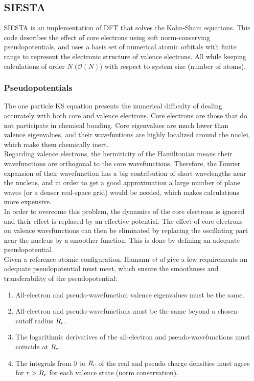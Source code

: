 
\subsection{SIESTA}
SIESTA\parencite{Soler2002} is an implementation of DFT that solves the Kohn-Sham equations. This code describes the effect of core electrons using soft norm-conserving pseudopotentials, and uses a basis set of numerical atomic orbitals with finite range to represent the electronic structure of valence electrons. All while keeping calculations of order \(N\) (\(\mathcal O(N)\)) with respect to system size (number of atoms).

\subsubsection*{Pseudopotentials}
The one particle KS equation presents the numerical difficulty of dealing accurately with both core and valence electrons. Core electrons are those that do not participate in chemical bonding. Core eigenvalues are much lower than valence eigenvalues, and their wavefuntions are highly localized around the nuclei, which make them chemically inert.\\

Regarding valence electrons, the hermiticity of the Hamiltonian means their wavefunctions are orthogonal to the core wavefunctions. Therefore, the Fourier expansion of their wavefunction has a big contribution of short wavelengths near the nucleus, and in order to get a good approximation a large number of plane waves (or a denser real-space grid) would be needed, which makes calculations more expensive.\\

In order to overcome this problem, the dynamics of the core electrons is ignored and their effect is replaced by an effective potential. The effect of core electrons on valence wavefunctions can then be eliminated by replacing the oscillating part near the nucleus by a smoother function. This is done by defining an adequate pseudopotential.\\

Given a reference atomic configuration, Hamann \textit{et al} give a few requirements an adequate pseudopotential must meet\parencite{Hamann1979}, which ensure the smoothness and transferability of the pseudopotential:
\begin{enumerate}
\item All-electron and pseudo-wavefunction valence eigenvalues must be the same.
\item All-electron and pseudo-wavefunctions must be the same beyond a chosen cutoff radius \(R_{\mathrm{c}}\).
\item The logarithmic derivatives of the all-electron and pseudo-wavefunctions must coincide at \(R_{\mathrm{c}}\).
\item The integrals from \(0\) to \(R_{\mathrm{c}}\) of the real and pseudo charge densities must agree for \(r > R_{\mathrm{c}}\) for each valence state (norm conservation).
\end{enumerate}

